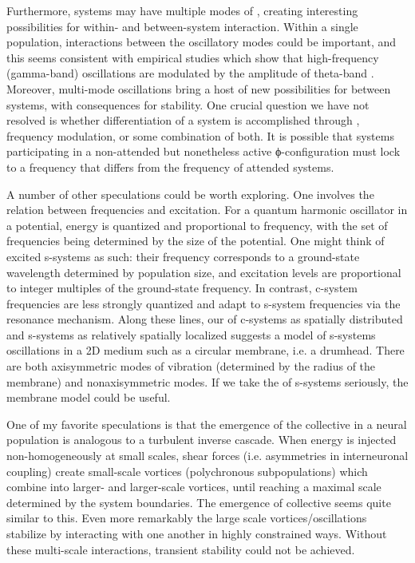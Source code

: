   Furthermore, systems may have multiple modes of , creating interesting possibilities for within- and between-system interaction. Within a single population, interactions between the oscillatory modes could be important, and this seems consistent with empirical studies which show that high-frequency (gamma-band) oscillations are modulated by the amplitude of theta-band . Moreover, multi-mode oscillations bring a host of new possibilities for  between systems, with consequences for stability. One crucial question we have not resolved is whether differentiation of a system is accomplished through , frequency modulation, or some combination of both. It is possible that systems participating in a non-attended but nonetheless active ϕ-configuration must lock to a frequency that differs from the frequency of attended systems.

  A number of other speculations could be worth exploring. One involves the relation between  frequencies and excitation. For a quantum harmonic oscillator in a potential, energy is quantized and proportional to frequency, with the set of frequencies being determined by the size of the potential. One might think of excited s-systems as such: their frequency corresponds to a ground-state wavelength determined by population size, and excitation levels are proportional to integer multiples of the ground-state frequency. In contrast, c-system frequencies are less strongly quantized and adapt to s-system frequencies via the resonance mechanism. Along these lines, our  of c-systems as spatially distributed and s-systems as relatively spatially localized suggests a model of s-systems oscillations in a 2D medium such as a circular membrane, i.e. a drumhead. There are both axisymmetric modes of vibration (determined by the radius of the membrane) and nonaxisymmetric modes. If we take the  of s-systems seriously, the membrane model could be useful.    

  One of my favorite speculations is that the emergence of the collective  in a neural population is analogous to a turbulent inverse cascade. When energy is injected non-homogeneously at small scales, shear forces (i.e. asymmetries in interneuronal coupling) create small-scale vortices (polychronous subpopulations) which combine into larger- and larger-scale vortices, until reaching a maximal scale determined by the system boundaries. The emergence of collective  seems quite similar to this. Even more remarkably the large scale vortices/oscillations stabilize by interacting with one another in highly constrained ways. Without these multi-scale interactions, transient stability could not be achieved.

